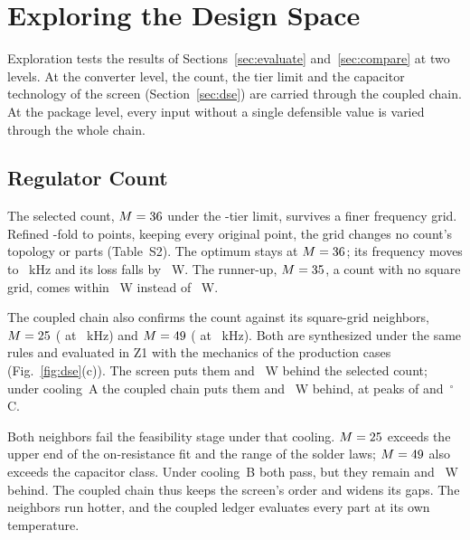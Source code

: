 \section{Exploring the Design Space}\label{sec:explore}

Exploration tests the results of Sections~\ref{sec:evaluate} and~\ref{sec:compare} at two levels.
At the converter level, the count, the tier limit and the capacitor technology of the screen
(Section~\ref{sec:dse}) are carried through the coupled chain. At the package level, every input
without a single defensible value is varied through the whole chain.

\subsection{Regulator Count}\label{sec:explore-count}
The selected count, $M = 36$ under the \FrDseOptTiersWord-tier limit, survives a finer
frequency grid. Refined \FrFswFineFactor-fold to \FrFswFineN{} points, keeping every original point,
the grid changes no count's topology or parts (Table~S2). The optimum stays at $M =
36$; its frequency moves to \FrFswFineOptFsw~kHz and its loss falls by
\FrFswFineOptGain~W. The runner-up, $M = 35$, a count with no square grid, comes
within \FrFswFineRunnerUpMargin~W instead of \FrFswCoarseRunnerUpMargin~W.

The coupled chain also confirms the count against its square-grid neighbors, $M = 25$
(\FrDseTwentyfiveTopo{} at \FrDseTwentyfiveFsw~kHz) and $M = 49$ (\FrDseFortynineTopo{} at
\FrDseFortynineFsw~kHz). Both are synthesized under the same rules and evaluated in Z1 with the
mechanics of the production cases (Fig.~\ref{fig:dse}(c)). The screen puts them
\FrDseTwentyfiveMargin{} and \FrDseFortynineMargin~W behind the selected count; under cooling~A the
coupled chain puts them \WrMloAZonedPAbs{} and \WrMhiAZonedPAbs~W behind, at peaks of
\WrMloAZoneTmax{} and \WrMhiAZoneTmax\,$^\circ$C.

Both neighbors fail the feasibility stage under that cooling. $M = 25$ exceeds the upper end
of the on-resistance fit and the range of the solder laws; $M = 49$ also exceeds the capacitor
class. Under cooling~B both pass, but they remain \WrMloBZonedPAbs{} and \WrMhiBZonedPAbs~W behind.
The coupled chain thus keeps the screen's order and widens its gaps. The neighbors run hotter,
and the coupled ledger evaluates every part at its own temperature.

